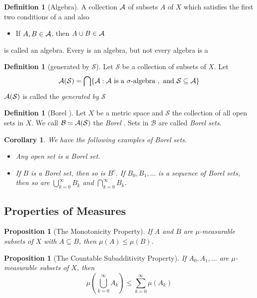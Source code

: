 \documentclass[10pt, oneside, reqno]{amsart}
\theoremstyle{plain}%
\newtheorem{prop}[thm]{Proposition}
\newtheorem*{cor}{Corollary}
\theoremstyle{definition}
\newtheorem{defn}[thm]{Definition}
\theoremstyle{remark}
\begin{document}
\begin{defn}[Algebra]
	A collection $\mathcal{A}$ of subsets $A$ of $X$ which satisfies the first two conditions of a \sig and also 
	\begin{itemize}
		\item If $A, B \in \mathcal{A}$, then $A \cup B \in \mathcal{A}$
	\end{itemize}
	is called an algebra.  Every \sig is an algebra, but not every algebra is a \sig
\end{defn}

\begin{defn}[\sig generated by $\mathcal{S}$]
	Let $\mathcal{S}$ be a collection of subsets of $X$.  Let \[
		\mathcal{A}(\mathcal{S}) = \bigcap \{ \mathcal{A} : \mathcal{A} \text{ is a $\sigma$-algebra }, \text{ and } \mathcal{S} \subseteq \mathcal{A} \}
	\]
$	\mathcal{A}(\mathcal{S})$ is called the \emph{\sig generated by $\mathcal{S}$}
\end{defn}

\begin{defn}[Borel \sig]
	Let $X$ be a metric space and $\mathcal{S}$ the collection of all open sets in $X$.  We call $\mathcal{B} = \mathcal{A}(\mathcal{S})$ the \emph{Borel \sig}.  Sets in $\mathcal{B}$ are called \emph{Borel sets}.
\end{defn}
\begin{cor}
	We have the following examples of Borel sets.
	\begin{itemize}
		\item Any open set is a Borel set.
		\item If $B$ is a Borel set, then so is $B^c$.
		If $B_0, B_1,\dots$ is a sequence of Borel sets, then so are $\bigcup_{k=0}^\infty B_k$ and $\bigcap_{k=0}^\infty B_k$.
	\end{itemize}
\end{cor}
\subsection{Properties of Measures} %
\label{sub:properties_of_measures}


\begin{prop}[The Monotonicity Property]
	If $A$ and $B$ are $\mu$-measurable subsets of $X$ with $A \subseteq B$, then $\mu(A)\leq \mu(B)$.
\end{prop}

\begin{prop}[The Countable Subadditivity Property]
	If $A_0,A_1,\dots$ are $\mu$-measurable subsets of $X$, then \[
		\mu(\bigcup_{k=0}^\infty A_k) \leq \sum_{k=0}^\infty \mu(A_k)
	\]
\end{prop}
\end{document}
